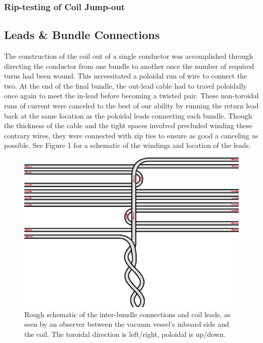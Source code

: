 \subsubsection{Rip-testing of Coil Jump-out}
 
\subsection{Leads \& Bundle Connections} 
The construction of the coil out of a single conductor was accomplished through directing the conductor from one bundle to another once the number of required turns had been wound.  This necessitated a poloidal run of wire to connect the two.  At the end of the final bundle, the out-lead cable had to travel poloidally once again to meet the in-lead before becoming a twisted pair.  These non-toroidal runs of current were canceled to the best of our ability by running the return lead back at the same location as the poloidal leads connecting each bundle.  Though the thickness of the cable and the tight spaces involved precluded winding these contrary wires, they were connected with zip ties to ensure as good a canceling as possible.  See Figure 1 for a schematic of the windings and location of the leads.\\

\begin{figure}
\includegraphics[width = \textwidth]{./figures/Coil_winding_schematic.png}\begin{flushleft}
\caption{Rough schematic of the inter-bundle connections and coil leads, as seen by an observer between the vacuum vessel's inboard side and the coil.  The toroidal direction is left/right, poloidal is up/down.}
\end{flushleft}
\label{coil_winding}
\end{figure}

